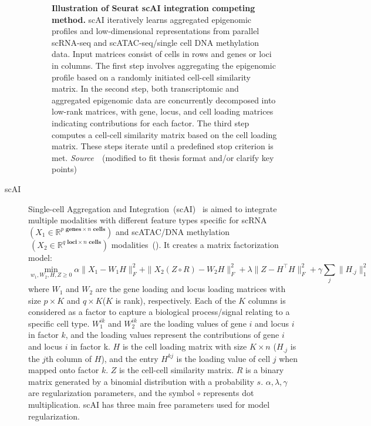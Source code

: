 \begin{description}
\begin{figure}[!h]
  	\vspace{0.1cm}
  	\caption[Illustration of Seurat scAI integration competing method.]{\textbf{Illustration of Seurat scAI integration competing method.} scAI iteratively learns aggregated epigenomic profiles and low-dimensional representations from parallel scRNA-seq and scATAC-seq/single cell DNA methylation data. Input matrices consist of cells in rows and genes or loci in columns. The first step involves aggregating the epigenomic profile based on a randomly initiated cell-cell similarity matrix. In the second step, both transcriptomic and aggregated epigenomic data are concurrently decomposed into low-rank matrices, with gene, locus, and cell loading matrices indicating contributions for each factor. The third step computes a cell-cell similarity matrix based on the cell loading matrix. These steps iterate until a predefined stop criterion is met. \emph{Source~\cite{jin2020scai}}~(modified to fit thesis format and/or clarify key points)
  }
  	\label{fig:Alg_scAI}
\end{figure}

  \item[scAI]
  Single-cell Aggregation and Integration~(scAI)~\citep{jin2020scai} is aimed to integrate multiple modalities with different feature types specific for scRNA $(X_1\in \mathbb{R}^{p \textbf{ genes} \times n \textbf{ cells}})$ and scATAC/DNA methylation$~(X_2\in \mathbb{R}^{q \textbf{ loci}\times n \textbf{ cells}})$ modalities~(). It creates a matrix factorization model:
  \begin{equation}
  \min_{w_1,W_2,H,Z\geq 0} \alpha \|X_1-W_1H\|_F^2 + \|X_2(Z \circ R)-W_2H\|_F^2 + \lambda \|Z-H^\top H\|_F^2 + \gamma\sum_j \|H_{.j}\|_1^2
  \end{equation}
  where $W_1$ and $W_2$ are the gene loading and locus loading matrices with size $p\times K$ and $q\times K$($K$ is rank), respectively. Each of the $K$ columns is considered as a factor to capture a biological process/signal relating to a specific cell type. $W_1^{ik}$ and $W_2^{ik}$ are the loading values of gene $i$ and locus $i$ in factor $k$, and the loading values represent the contributions of gene $i$ and locus $i$ in factor k. $H$ is the cell loading matrix with size $K\times n$ ($H_{.j}$ is the $j$th column of $H$), and the entry $H^{kj}$ is the loading value of cell $j$ when mapped onto factor $k$. $Z$ is the cell-cell similarity matrix. $R$ is a binary matrix generated by a binomial distribution with a probability $s$. $\alpha, \lambda, \gamma$ are regularization parameters, and the symbol $\circ$ represents dot multiplication. scAI has three main free parameters used for model regularization.



\end{description}
